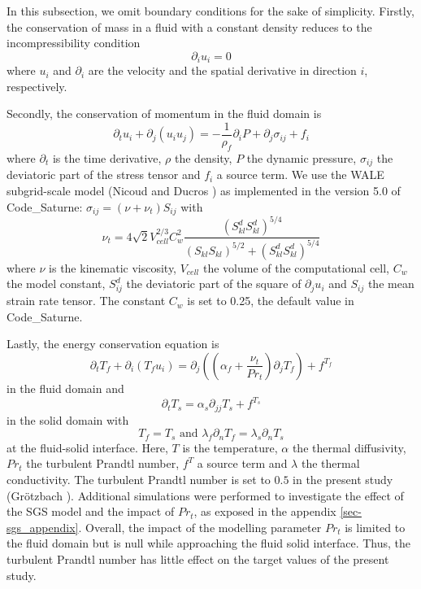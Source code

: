 \documentclass{svjour3}                     %
\begin{document}
In this subsection, we omit boundary conditions for the sake of simplicity.
Firstly, the conservation of mass in a fluid with a constant density reduces to the incompressibility condition
\begin{equation}
\partial_i u_i = 0
\end{equation}
where $u_i$ and $\partial_i$ are the velocity and the spatial derivative in direction $i$, respectively.

Secondly, the conservation of momentum in the fluid domain is
\begin{equation}
\partial_t u_i + \partial_j \left( u_i u_j \right) = - \frac{1}{\rho_f} \partial_i P + \partial_j \sigma_{ij} + f_i
\end{equation}
where $\partial_t$ is the time derivative, $\rho$ the density, $P$ the dynamic pressure, $\sigma_{ij}$ the deviatoric part of the stress tensor and $f_i$ a source term.
We use the WALE subgrid-scale model (Nicoud and Ducros \cite{nicoud1999subgrid}) as implemented in the version 5.0 of {\selectfont Code\_Saturne}: ${\sigma_{ij} = \left( \nu + \nu_t \right) S_{ij}}$ with
\begin{equation}
\nu_t = 4 \sqrt{2} V_{cell}^{2/3} C_w^2 \frac{\left(S_{kl}^dS_{kl}^d\right)^{5/4}}{\left(S_{kl}S_{kl}\right)^{5/2} + \left(S_{kl}^dS_{kl}^d\right)^{5/4}} 
\end{equation}
where $\nu$ is the kinematic viscosity, $V_{cell}$ the volume of the computational cell, $C_w$ the model constant, $S_{ij}^d$ the deviatoric part of the square of $\partial_j u_i$ and $S_{ij}$ the mean strain rate tensor.
The constant $C_w$ is set to 0.25, the default value in {\selectfont Code\_Saturne}.

Lastly, the energy conservation equation is
\begin{equation}
\partial_t T_f + \partial_i \left( T_f u_i \right) = \partial_j \left( \left( \alpha_f + \frac{\nu_t}{{Pr}_t} \right) \partial_j T_f \right) + f^{T_f}
\end{equation}
in the fluid domain and
\begin{equation}
\partial_t T_s = \alpha_s \partial_{jj} T_s + f^{T_s}
\end{equation}
in the solid domain with
\begin{equation}
T_f = T_s \mbox{ and } \lambda_f \partial_n T_f = \lambda_s \partial_n T_s
\end{equation}
at the fluid-solid interface.
Here, $T$ is the temperature, $\alpha$ the thermal diffusivity, ${Pr}_t$ the turbulent Prandtl number, $f^T$ a source term and $\lambda$ the thermal conductivity.
The turbulent Prandtl number is set to $0.5$ in the present study (Gr\"{o}tzbach \cite{grotzbach2011revisiting}).
Additional simulations were performed to investigate the effect of the SGS model and the impact of $Pr_t$, as exposed in the appendix \ref{sec-sgs_appendix}.
Overall, the impact of the modelling parameter $Pr_t$ is limited to the fluid domain but is null while approaching the fluid solid interface.
Thus, the turbulent Prandtl number has little effect on the target values of the present study.
\end{document}
